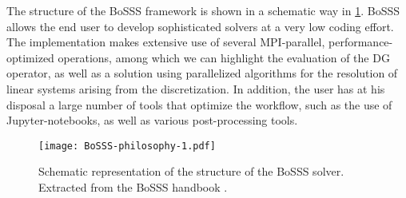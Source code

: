 The structure of the BoSSS framework is shown in a schematic way in \cref{Fig:BoSSS}. BoSSS allows the end user to develop sophisticated solvers at a very low coding effort. The implementation makes extensive use of several \gls{MPI}-parallel, performance-optimized operations, among which we can highlight the evaluation of the DG operator, as well as a solution using parallelized algorithms for the resolution of linear systems arising from the discretization. In addition, the user has at his disposal a large number of tools that optimize the workflow, such as the use of Jupyter-notebooks, as well as various post-processing tools.

\begin{figure}
	\texttt{[image: BoSSS-philosophy-1.pdf]}
	\caption[Schematic representation of the structure of the BoSSS solver.]{Schematic representation of the structure of the BoSSS solver. Extracted from the BoSSS handbook \parencite{kummer2020}.}
	\label{Fig:BoSSS}
\end{figure}
